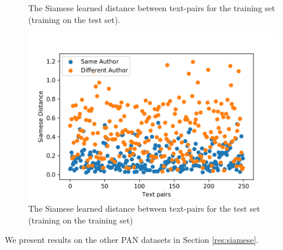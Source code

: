 \begin{figure}[!htb]
\begin{minipage}[b]{0.49\textwidth}
    \caption{The Siamese learned distance between text-pairs for the training set (training on the test set). \label{fig:siam_train}}
  \end{minipage}
  \hfill
  \begin{minipage}[b]{0.49\textwidth}
    \includegraphics[width=\textwidth]{test_siam}
    \caption{The Siamese learned distance between text-pairs for the test set (training on the training set) \label{fig:siam_test}}
  \end{minipage}
\end{figure}


We present results on the other PAN datasets in Section \ref{res:siamese}.
